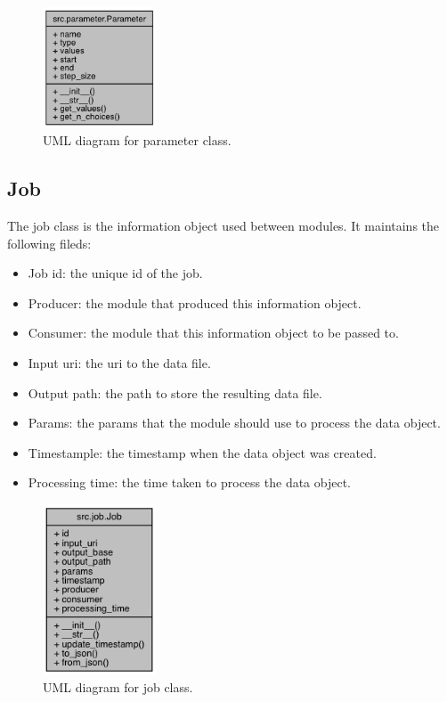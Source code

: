 \documentclass{article}
\begin{document}
    \begin{figure}[H]
        \begin{center}
            \includegraphics[width=0.3\textwidth]{fig/param_uml.png}
        \end{center}
        \label{fig:param_uml}
        \caption{UML diagram for parameter class.}
    \end{figure}

    \subsection{Job}
    \label{sec:job}
    The job class is the information object used between modules.
    It maintains the following fileds:

    \begin{itemize}
        \item Job id: the unique id of the job.
        \item Producer: the module that produced this information object.
        \item Consumer: the module that this information object to be passed to.
        \item Input uri: the uri to the data file.
        \item Output path: the path to store the resulting data file.
        \item Params: the params that the module should use to process the data object.
        \item Timestample: the timestamp when the data object was created.
        \item Processing time: the time taken to process the data object.
    \end{itemize}


    \begin{figure}[H]
        \begin{center}
            \includegraphics[width=0.3\textwidth]{fig/job_uml.png}
        \end{center}
        \label{fig:job_uml}
        \caption{UML diagram for job class.}
    \end{figure}
\end{document}
